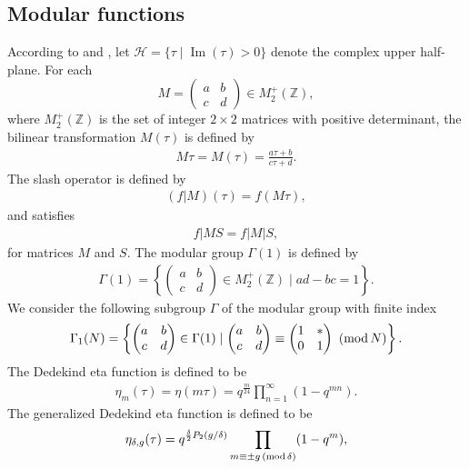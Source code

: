 \documentclass[pdftex]{sigma}
\numberwithin{equation}{section}
\theoremstyle{definition}
\begin{document}
\subsection{Modular functions}
According to \cite{Berndt-III} and \cite{Ra77}, let $\mathcal{H}=\{\tau \mid \operatorname{Im}(\tau) > 0\}$ denote the complex upper half-plane. For each \[M=\begin{pmatrix} a & b \\c & d \end{pmatrix} \in M_2^{+}(\mathbb{Z}),\] where $M_2^{+}(\mathbb{Z})$ is the set of integer $2\times 2$ matrices with positive determinant, the bilinear transformation $M(\tau)$ is defined by
\begin{align*}
M\tau=M(\tau)=\frac{a\tau+b}{c\tau+d}.
\end{align*}
The slash operator is defined by
\begin{align*}
(f|M)(\tau)=f(M\tau),
\end{align*}
and satisfies
\begin{align*}
f|MS=f|M|S,
\end{align*}
for matrices $M$ and $S$. The modular group $\Gamma(1)$ is defined by
\begin{align*}
\Gamma(1)=\left\{\begin{pmatrix} a & b \\c & d \end{pmatrix} \in M_2^{+}(\mathbb{Z}) \mid ad-bc=1 \right\}.
\end{align*}
We consider the following subgroup $\Gamma$ of the modular group with finite index
\begin{align*}
\Gamma_1(N)=\left\{\begin{pmatrix} a & b \\c & d \end{pmatrix} \in \Gamma(1) \mid \begin{pmatrix} a & b \\c & d \end{pmatrix}  \equiv \begin{pmatrix} 1 & * \\0 & 1 \end{pmatrix} \ ({\rm mod}\, N) \right\}.
\end{align*}
The Dedekind eta function is defined to be
\begin{align*}
\eta_m(\tau)=\eta(m\tau)=q^{\frac{m}{24}}\prod_{n=1}^{\infty}(1-q^{mn}).
\end{align*}
The generalized Dedekind eta function is defined to be
\begin{align}\label{generalized-eta}
\eta_{\delta,g}(\tau)=q^{\frac{\delta}{2}P_2(g/\delta)}\prod_{m\equiv\pm g\,({\rm mod}\,\delta)}(1-q^m),
\end{align}
\end{document}
